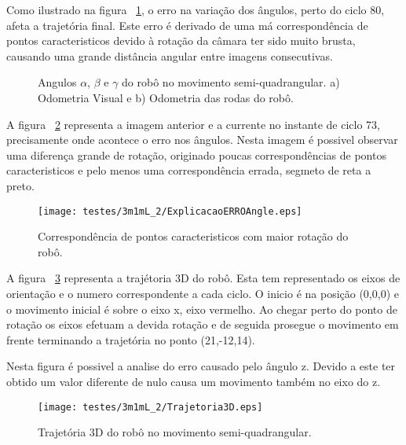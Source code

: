 Como ilustrado na figura ~\ref{fig:ang3m1mL_2}, o erro na variação dos ângulos, perto do ciclo 80, afeta a trajetória final. Este erro é derivado de uma má correspondência de pontos caracteristicos devido à rotação da câmara ter sido muito brusta, causando uma grande distância angular entre imagens consecutivas.


\begin{figure}[h!]
	\centering
	\qquad
	\caption{Angulos $\alpha$, $\beta$ e $\gamma$ do robô  no movimento semi-quadrangular. a) Odometria Visual e b) Odometria das rodas do robô.}
	\label{fig:ang3m1mL_2}
\end{figure}

\pagebreak

A figura ~\ref{fig:ExplicAngErr3m1mL_2} representa a imagem anterior e a currente no instante de ciclo 73, precisamente onde acontece o erro nos ângulos. Nesta imagem é possivel observar uma diferença grande de rotação, originado poucas correspondências de pontos caracteristicos e pelo menos uma correspondência errada, segmeto de reta a preto.

\begin{figure}[h!]
	\begin{center}
		\leavevmode		
		\texttt{[image: testes/3m1mL\_2/ExplicacaoERROAngle.eps]}
		\caption{Correspondência de pontos caracteristicos com maior rotação do robô.}
		\label{fig:ExplicAngErr3m1mL_2}
	\end{center}
\end{figure}


A figura ~\ref{fig:Traj3D3m1mL_2} representa a trajétoria 3D do robô. Esta tem representado os eixos de orientação e o numero correspondente a cada ciclo. O inicio é na posição (0,0,0) e o movimento inicial é sobre o eixo x, eixo vermelho. Ao chegar perto do ponto de rotação os eixos efetuam a devida rotação e de seguida prosegue o movimento em frente terminando a trajetória no ponto (21,-12,14). 

Nesta figura é possivel a analise do erro causado pelo ângulo z. Devido a este ter obtido um valor diferente de nulo causa um movimento também no eixo do z.

\begin{figure}[h!]
	\begin{center}
		\leavevmode		
		\texttt{[image: testes/3m1mL\_2/Trajetoria3D.eps]}
		\caption{Trajetória 3D do robô no movimento semi-quadrangular.}
		\label{fig:Traj3D3m1mL_2}
	\end{center}
\end{figure}






